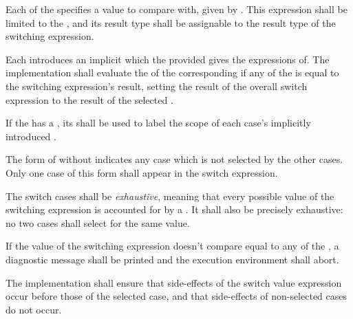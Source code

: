 \specsubsubitem
Each of the  specifies a value to compare with, given
by . This expression shall be limited to the
, and its result type shall be
assignable to the result type of the switching expression.

\specsubsubitem
Each  introduces an implicit
 which the provided
 gives the expressions of. The implementation
shall evaluate the  of the corresponding
 if any of the  is equal to
the switching expression's result, setting the result of the overall switch
expression to the result of the selected .


\specsubsubitem
If the  has a , its
 shall be used to label the scope of each case's implicitly
introduced .

\specsubsubitem
The form of  without 
indicates any case which is not selected by the other cases. Only one case of
this form shall appear in the switch expression.

\specsubsubitem
The switch cases shall be \textit{exhaustive}, meaning that every possible
value of the switching expression is accounted for by a
. It shall also be precisely exhaustive: no two cases
shall select for the same value.

\specsubsubitem
If the value of the switching expression doesn't compare equal to any of the
, a diagnostic message shall be printed and the
execution environment shall abort.


\specsubsubitem
The implementation shall ensure that side-effects of the switch value
expression occur before those of the selected case, and that side-effects of
non-selected cases do not occur.

